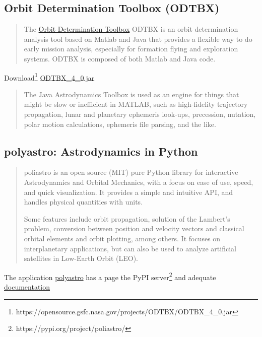\subsection{Orbit Determination Toolbox (ODTBX)}
\begin{quotation}
The \href{https://opensource.gsfc.nasa.gov/projects/ODTBX/}{Orbit Determination Toolbox} ODTBX is an orbit determination analysis tool based on Matlab and Java that provides a flexible way to do early mission analysis, especially for formation flying and exploration systems. ODTBX is composed of both Matlab and Java code.
\end{quotation}

Download\footnote{https://opensource.gsfc.nasa.gov/projects/ODTBX/ODTBX\_4\_0.jar} \href{https://opensource.gsfc.nasa.gov/projects/ODTBX/ODTBX_4_0.jar}{ODTBX\_4\_0.jar}

\begin{quotation}
The Java
Astrodynamics Toolbox is used as an engine for things that might be slow or inefficient in MATLAB, such as high-fidelity trajectory propagation, lunar and planetary ephemeris look-ups, precession, nutation, polar motion calculations, ephemeris file parsing, and the like.
\end{quotation}

\subsection{polyastro: Astrodynamics in Python}
\begin{quotation}
poliastro is an open source (MIT) pure Python library for interactive Astrodynamics and Orbital Mechanics, with a focus on ease of use, speed, and quick visualization. It provides a simple and intuitive API, and handles physical quantities with units.

Some features include orbit propagation, solution of the Lambert's problem, conversion between position and velocity vectors and classical orbital elements and orbit plotting, among others. It focuses on interplanetary applications, but can also be used to analyze artificial satellites in Low-Earth Orbit (LEO).
\end{quotation}

The application \href{https://pypi.org/project/poliastro/}{polyastro} has a page the PyPI server\footnote{https://pypi.org/project/poliastro/} and adequate \href{https://docs.poliastro.space/en/stable/}{documentation}

